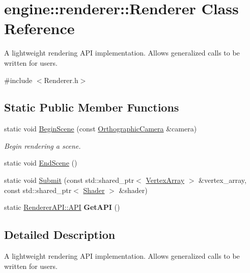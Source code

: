 \hypertarget{classengine_1_1renderer_1_1Renderer}{}\section{engine\+:\+:renderer\+:\+:Renderer Class Reference}
\label{classengine_1_1renderer_1_1Renderer}


A lightweight rendering A\+PI implementation. Allows generalized calls to be written for users.  




{\ttfamily \#include $<$Renderer.\+h$>$}

\subsection*{Static Public Member Functions}
\begin{DoxyCompactItemize}
\item 
\mbox{\label{classengine_1_1renderer_1_1Renderer_a07fcd1f8a780b8ef8fcb01dc97dc0db9}} 
static void \hyperlink{classengine_1_1renderer_1_1Renderer_a07fcd1f8a780b8ef8fcb01dc97dc0db9}{Begin\+Scene} (const \hyperlink{classengine_1_1renderer_1_1OrthographicCamera}{Orthographic\+Camera} \&camera)
\begin{DoxyCompactList}\small\item\em Begin rendering a scene. \end{DoxyCompactList}\item 
static void \hyperlink{classengine_1_1renderer_1_1Renderer_aabecab3b2aea9d925bd7449c7f85539b}{End\+Scene} ()
\item 
static void \hyperlink{classengine_1_1renderer_1_1Renderer_a1d894d1fa8231d1c4016fba0e1aaab3e}{Submit} (const std\+::shared\+\_\+ptr$<$ \hyperlink{classengine_1_1renderer_1_1VertexArray}{Vertex\+Array} $>$ \&vertex\+\_\+array, const std\+::shared\+\_\+ptr$<$ \hyperlink{classengine_1_1renderer_1_1Shader}{Shader} $>$ \&shader)
\item 
\mbox{\label{classengine_1_1renderer_1_1Renderer_a61d12573cda993102d8e335f17380c8a}} 
static \hyperlink{classengine_1_1renderer_1_1RendererAPI_a624c2793dc8b315466c36332bbc82ef0}{Renderer\+A\+P\+I\+::\+A\+PI} {\bfseries Get\+A\+PI} ()
\end{DoxyCompactItemize}


\subsection{Detailed Description}
A lightweight rendering A\+PI implementation. Allows generalized calls to be written for users. 

